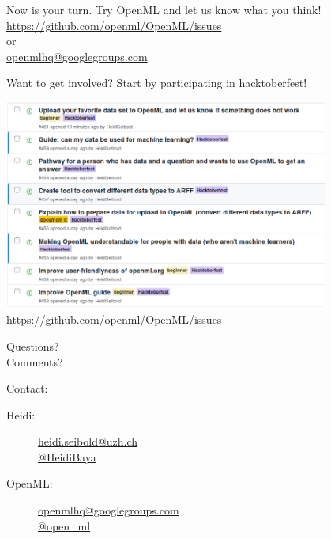 \documentclass{beamer}
\begin{document}
\begin{frame}[fragile]{}
\begin{center}
\Large Now is your turn. Try OpenML and let us know what you think!\\[2em]
\url{https://github.com/openml/OpenML/issues}\\
or\\
\url{openmlhq@googlegroups.com}
\end{center}
\end{frame}


\begin{frame}[fragile]{Want to get involved?}
Start by participating in hacktoberfest!
\begin{center}
\includegraphics[width = 0.8\textwidth]{issues}\\
\url{https://github.com/openml/OpenML/issues}
\end{center}
\end{frame}

\begin{frame}[fragile]{}
\begin{center}
\Large
Questions?\\
Comments?\\[3em]
\end{center}
Contact:\\
\begin{description}
 \item[Heidi:] \url{heidi.seibold@uzh.ch}\\ \url{@HeidiBaya}\\
 \item[OpenML:] \url{openmlhq@googlegroups.com}\\ \url{@open_ml}\\
\end{description}
\end{frame}
\end{document}
